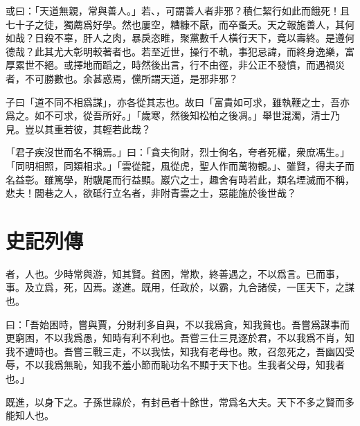 或曰：「天道無親，常與善人。」若、，可謂善人者非邪？積仁絜行如此而餓死！且七十子之徒，獨薦爲好學。然也屢空，糟糠不厭，而卒蚤夭。天之報施善人，其何如哉？日殺不辜，肝人之肉，暴戾恣睢，聚黨數千人橫行天下，竟以壽終。是遵何德哉？此其尤大彰明較著者也。若至近世，操行不軌，事犯忌諱，而終身逸樂，富厚累世不絕。或擇地而蹈之，時然後出言，行不由徑，非公正不發憤，而遇禍災者，不可勝數也。余甚惑焉，儻所謂天道，是邪非邪？

子曰「道不同不相爲謀」，亦各從其志也。故曰「富貴如可求，雖執鞭之士，吾亦爲之。如不可求，從吾所好。」「歲寒，然後知松柏之後凋。」舉世混濁，清士乃見。豈以其重若彼，其輕若此哉？

「君子疾沒世而名不稱焉。」曰：「貪夫徇財，烈士徇名，夸者死權，衆庶馮生。」「同明相照，同類相求。」「雲從龍，風從虎，聖人作而萬物覩。」、雖賢，得夫子而名益彰。雖篤學，附驥尾而行益顯。巖穴之士，趣舍有時若此，類名堙滅而不稱，悲夫！閭巷之人，欲砥行立名者，非附青雲之士，惡能施於後世哉？

\section[管晏列傳\quad{\small 史記}]{{\normalsize 史記}\quad{}列傳}
者，人也。少時常與游，知其賢。貧困，常欺，終善遇之，不以爲言。已而事，事。及立爲，死，囚焉。遂進。既用，任政於，以霸，九合諸侯，一匡天下，之謀也。

曰：「吾始困時，嘗與賈，分財利多自與，不以我爲貪，知我貧也。吾嘗爲謀事而更窮困，不以我爲愚，知時有利不利也。吾嘗三仕三見逐於君，不以我爲不肖，知我不遭時也。吾嘗三戰三走，不以我怯，知我有老母也。敗，召忽死之，吾幽囚受辱，不以我爲無恥，知我不羞小節而恥功名不顯于天下也。生我者父母，知我者也。」

既進，以身下之。子孫世祿於，有封邑者十餘世，常爲名大夫。天下不多之賢而多能知人也。


